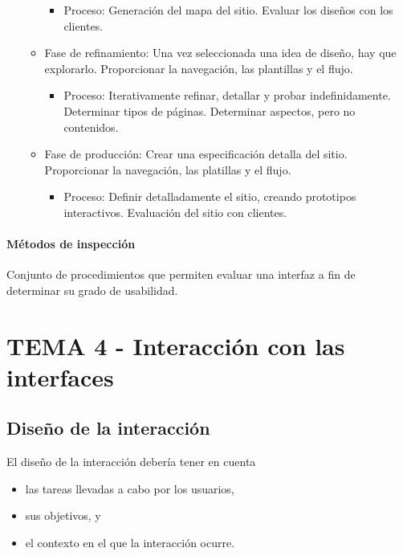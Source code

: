 \documentclass[12pt, twoside, openright]{report} %
\begin{document}
\begin{itemize}
\begin{itemize}
\begin{itemize}
      \item Proceso: Generación del mapa del sitio. Evaluar los diseños con los clientes.\end{itemize}
  \item Fase de refinamiento: Una vez seleccionada una idea de diseño, hay que explorarlo. Proporcionar la navegación, las plantillas y el flujo.
  \begin{itemize}

      \item Proceso: Iterativamente refinar, detallar y probar indefinidamente. Determinar tipos de páginas. Determinar aspectos, pero no contenidos.\end{itemize}
  \item Fase de producción: Crear una especificación detalla del sitio. Proporcionar la navegación, las platillas y el flujo.
  \begin{itemize}

      \item Proceso: Definir detalladamente el sitio, creando prototipos interactivos. Evaluación del sitio con clientes.\end{itemize}
        \end{itemize}
      \end{itemize}
  
    
    
\subsubsection{Métodos de inspección} Conjunto de procedimientos que permiten
      evaluar una interfaz a fin de determinar su grado de usabilidad.

\chapter{TEMA 4 - Interacción con las interfaces}

\section{Diseño de la interacción}

    El diseño de la interacción debería tener en cuenta

    \begin{itemize}
    
    \item
      las tareas llevadas a cabo por los usuarios,
    \item
      sus objetivos, y
    \item
      el contexto en el que la interacción ocurre.
    \end{itemize}
\end{document}
